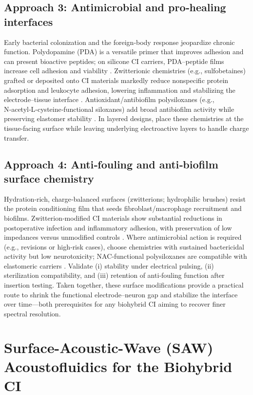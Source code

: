\documentclass[referee,pdflatex, sn-vancouver-num]{sn-jnl}%
\theoremstyle{thmstyleone}%
\theoremstyle{thmstyletwo}%
\theoremstyle{thmstylethree}%
\begin{document}
\subsection{Approach 3: Antimicrobial and pro‑healing interfaces}
Early bacterial colonization and the foreign‑body response jeopardize chronic function. Polydopamine (PDA) is a versatile primer that improves adhesion and can present bioactive peptides; on silicone CI carriers, PDA–peptide films increase cell adhesion and viability \cite{Schendzielorz2017}. Zwitterionic chemistries (e.g., sulfobetaines) grafted or deposited onto CI materials markedly reduce nonspecific protein adsorption and leukocyte adhesion, lowering inflammation and stabilizing the electrode–tissue interface \cite{Horne2023_ActaBiomater_ZwitterionCI,Chen2023_MTBio_ZwitterionCI}. Antioxidant/antibiofilm polysiloxanes (e.g., N‑acetyl‑L‑cysteine‑functional siloxanes) add broad antibiofilm activity while preserving elastomer stability \cite{Cozma2021-jb}. In layered designs, place these chemistries at the tissue‑facing surface while leaving underlying electroactive layers to handle charge transfer.

\subsection{Approach 4: Anti‑fouling and anti‑biofilm surface chemistry}
Hydration‑rich, charge‑balanced surfaces (zwitterions; hydrophilic brushes) resist the protein conditioning film that seeds fibroblast/macrophage recruitment and biofilms. Zwitterion‑modified CI materials show substantial reductions in postoperative infection and inflammatory adhesion, with preservation of low impedances versus unmodified controls \cite{Chen2023_MTBio_ZwitterionCI,Horne2023_ActaBiomater_ZwitterionCI}. Where antimicrobial action is required (e.g., revisions or high‑risk cases), choose chemistries with sustained bactericidal activity but low neurotoxicity; NAC‑functional polysiloxanes are compatible with elastomeric carriers \cite{Cozma2021-jb}. Validate (i) stability under electrical pulsing, (ii) sterilization compatibility, and (iii) retention of anti‑fouling function after insertion testing. Taken together, these surface modifications provide a practical route to shrink the functional electrode–neuron gap and stabilize the interface over time—both prerequisites for any biohybrid CI aiming to recover finer spectral resolution.

\section{Surface-Acoustic-Wave (SAW) Acoustofluidics for the Biohybrid CI}\label{sec7}
\end{document}
